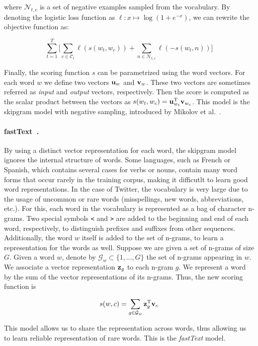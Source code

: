 \noindent where $\mathcal{N}_{t,c}$ is a set of negative examples sampled from
the vocabulary. 
%
By denoting the logistic loss function as $\ell : x \mapsto \log(1+\mathit{e}^{-x})$, we
can rewrite the objective function as:

$$\sum_{t=1}^T \Big[ \sum_{c\in\mathcal{C}_t} \ell(s(w_t, w_c)) + \sum_{n\in\mathcal{N}_{t,c}}\ell(-s(w_t, n))\Big]$$

Finally, the scoring function $s$ can be parametrized using the word vectors. 
%
For each word $w$ we define two vectors $\boldsymbol{\mathbf{u}}_w$ and $\boldsymbol{\mathbf{v}}_w$.
%
These two vectors are sometimes referred as {\em input} and {\em output}
vectors, respectively.
%
Then the score is computed as the scalar product between the vectors as $s(w_t,
w_c) = \boldsymbol{\mathbf{u}}^\text{T}_{w_t}\boldsymbol{\mathbf{v}}_{w_c}$.
%
This model is the skipgram model with negative sampling, introduced by Mikolov
et al.~\cite{mikolov2013distributed}.


\paragraph{fastText~\cite{bojanowski2017enriching}.} 
By using a distinct vector representation for each word, the skipgram model
ignores the internal structure of words. 
%
Some languages, such as French or Spanish, which contains several cases for
verbs or nouns, contain many word forms that occur rarely in the training
corpus, making it difficutlt to learn good word representations.
%
In the case of Twitter, the vocabulary is very large due to the usage of
uncommon or rare words (misspellings, new words, abbreviations, etc.).
%
For this, each word in the vocabulary is represented as a bag of character
n-grams. 
%
Two special symbols {\tt <} and {\tt >} are added to the beginning and end of
each word, respectively, to distinguish prefixes and suffixes from other
sequences.
%
Additionally, the word $w$ itself is added to the set of n-grams, to learn a
representation for the words as well. 
%
Suppose we are given a set of n-grams of size $G$. 
%
Given a word $w$, denote by $\mathcal{G}_w \subset \{1, \ldots, G\}$ the set of
n-grams appearing in $w$.
%
We associate a vector representation $\boldsymbol{\mathbf{z}}_g$ to each n-gram $g$. 
%
We represent a word by the sum of the vector representations of its n-grams.
%
Thus, the new scoring function is

$$s(w, c) = \sum_{g\in\mathcal{G}_w}\boldsymbol{\mathbf{z}}^\text{T}_g\boldsymbol{\mathbf{v}}_c$$

This model allows us to share the representation across words, thus allowing us
to learn reliable representation of rare words.
%
This is the {\em fastText} model.